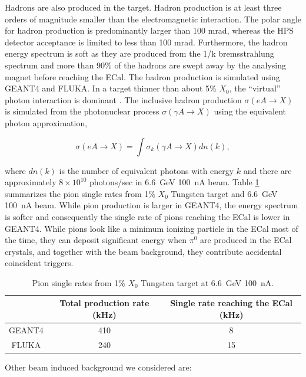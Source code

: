 Hadrons are also produced in the target. Hadron production is at least three orders
of magnitude smaller than the electromagnetic interaction. The polar angle for hadron production
is predominantly larger than 100 mrad, whereas the HPS detector acceptance is limited to less than
100 mrad. Furthermore, the hadron energy spectrum is soft as they are produced from the 1/k bremsstrahlung
spectrum and more than 90\% of the hadrons are swept away by the analysing magnet before reaching the ECal.
 The hadron production is simulated using GEANT4 and FLUKA. In a target thinner than
about 5\% $X_0$, the ``virtual'' photon interaction is dominant \cite{mohring}. The inclusive hadron
production ${\sigma (eA\rightarrow X)}$ is simulated from the photonuclear process ${\sigma (\gamma A
\rightarrow X)}$ using the equivalent photon approximation,

$$ \sigma (eA \rightarrow X) = \int \sigma_k(\gamma A \rightarrow X) dn(k), $$

\noindent
where $dn(k)$ is the number of equivalent photons with energy $k$ \cite{budnev} and there are 
approximately $8 \times 10^{10} $ photons/sec in 6.6~GeV 100~nA beam. 
Table \ref{tab:pion} summarizes the pion single rates from 1\% $X_0$ Tungsten target
and 6.6~GeV 100~nA beam. While pion production is larger in GEANT4, the energy spectrum is softer and
consequently the single rate of pions reaching the ECal is lower in GEANT4. While pions look like a minimum 
ionizing particle in the ECal most of the time, they can deposit significant energy when ${\pi^0}$ are
produced in the ECal crystals, and together with the beam background, they contribute accidental coincident triggers. 

\begin{table}[h]
\begin{center}
\begin{tabular}{|c|c|c|} \hline
  & Total production rate (kHz) & Single rate reaching the ECal (kHz) \\ \hline
GEANT4 & 410 & 8 \\ \hline
FLUKA  & 240 & 15 \\ \hline
\end{tabular}
\end{center}
\caption{\small{Pion single rates from 1\% $X_0$ Tungsten target at 6.6~GeV 100~nA.}}
\label{tab:pion}
\end{table}

\pagebreak
\noindent
Other beam induced background we considered are:

